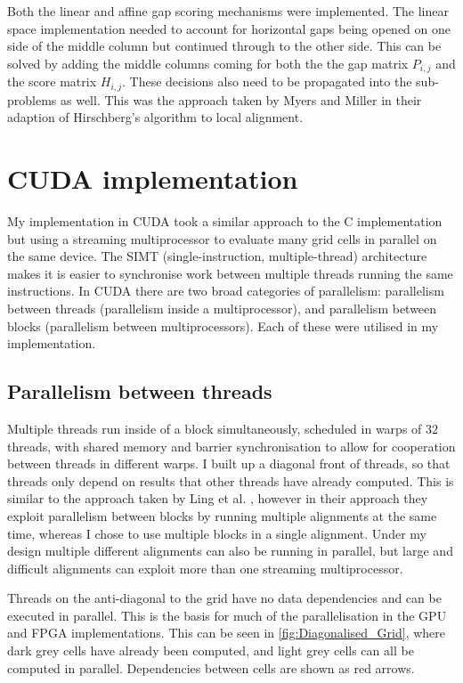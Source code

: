 Both the linear and affine gap scoring mechanisms were implemented.
The linear space implementation needed to account for horizontal gaps being opened on one side of the middle column but continued through to the other side.
This can be solved by adding the middle columns coming for both the the gap matrix $P_{i,j}$ and the score matrix $H_{i,j}$.
These decisions also need to be propagated into the sub-problems as well.
This was the approach taken by Myers and Miller \cite{MyersMiller} in their adaption of Hirschberg’s algorithm \cite{Hirschberg} to local alignment.

\section{CUDA implementation}
\label{sec:CUDA_impl}
My implementation in CUDA took a similar approach to the C implementation but using a streaming multiprocessor to evaluate many grid cells in parallel on the same device.
The SIMT (single-instruction, multiple-thread) architecture makes it is easier to synchronise work between multiple threads running the same instructions.
In CUDA there are two broad categories of parallelism: parallelism between threads (parallelism inside a multiprocessor), and parallelism between blocks (parallelism between multiprocessors).
Each of these were utilised in my implementation.

\subsection{Parallelism between threads}
\label{sec:Thread_Parallelism_in_CUDA}
Multiple threads run inside of a block simultaneously, scheduled in warps of $32$ threads, with shared memory and barrier synchronisation to allow for cooperation between threads in different warps.
I built up a diagonal front of threads, so that threads only depend on results that other threads have already computed.
This is similar to the approach taken by Ling et al. \cite{Ling_GPU}, however in their approach they exploit parallelism between blocks by running multiple alignments at the same time, whereas I chose to use multiple blocks in a single alignment.
Under my design multiple different alignments can also be running in parallel, but large and difficult alignments can exploit more than one streaming multiprocessor.

Threads on the anti-diagonal to the grid have no data dependencies and can be executed in parallel.
This is the basis for much of the parallelisation in the GPU and FPGA implementations.
This can be seen in \cref{fig:Diagonalised_Grid}, where dark grey cells have already been computed, and light grey cells can all be computed in parallel.
Dependencies between cells are shown as red arrows.

